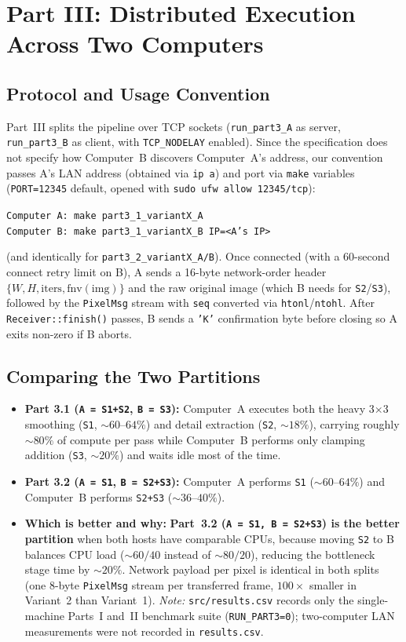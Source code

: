\documentclass[10pt,a4paper]{article}
\begin{document}
\section{Part III: Distributed Execution Across Two Computers}

\subsection{Protocol and Usage Convention}
Part~III splits the pipeline over TCP sockets (\texttt{run\_part3\_A} as server, \texttt{run\_part3\_B} as client, with \texttt{TCP\_NODELAY} enabled). Since the specification does not specify how Computer~B discovers Computer~A's address, our convention passes A's LAN address (obtained via \texttt{ip a}) and port via \texttt{make} variables (\texttt{PORT=12345} default, opened with \texttt{sudo ufw allow 12345/tcp}):
\begin{center}
\small
\texttt{Computer A: make part3\_1\_variantX\_A}\\
\texttt{Computer B: make part3\_1\_variantX\_B IP=<A's IP>}
\end{center}
(and identically for \texttt{part3\_2\_variantX\_A/B}). Once connected (with a 60-second connect retry limit on B), A sends a 16-byte network-order header $\{W, H, \text{iters}, \text{fnv}(\text{img})\}$ and the raw original image (which B needs for \texttt{S2}/\texttt{S3}), followed by the \texttt{PixelMsg} stream with \texttt{seq} converted via \texttt{htonl}/\texttt{ntohl}. After \texttt{Receiver::finish()} passes, B sends a \texttt{'K'} confirmation byte before closing so A exits non-zero if B aborts.

\subsection{Comparing the Two Partitions}
\begin{itemize}
    \item \textbf{Part 3.1 (\texttt{A = S1+S2}, \texttt{B = S3}):} Computer~A executes both the heavy 3$\times$3 smoothing (\texttt{S1}, $\sim 60\text{--}64\%$) and detail extraction (\texttt{S2}, $\sim 18\%$), carrying roughly $\sim 80\%$ of compute per pass while Computer~B performs only clamping addition (\texttt{S3}, $\sim 20\%$) and waits idle most of the time.
    \item \textbf{Part 3.2 (\texttt{A = S1}, \texttt{B = S2+S3}):} Computer~A performs \texttt{S1} ($\sim 60\text{--}64\%$) and Computer~B performs \texttt{S2+S3} ($\sim 36\text{--}40\%$).
    \item \textbf{Which is better and why:} \textbf{Part~3.2 (\texttt{A = S1, B = S2+S3}) is the better partition} when both hosts have comparable CPUs, because moving \texttt{S2} to B balances CPU load ($\sim 60/40$ instead of $\sim 80/20$), reducing the bottleneck stage time by $\sim 20\%$. Network payload per pixel is identical in both splits (one 8-byte \texttt{PixelMsg} stream per transferred frame, $100\times$ smaller in Variant~2 than Variant~1). \emph{Note:} \texttt{src/results.csv} records only the single-machine Parts~I and~II benchmark suite (\texttt{RUN\_PART3=0}); two-computer LAN measurements were not recorded in \texttt{results.csv}.
\end{itemize}
\end{document}
